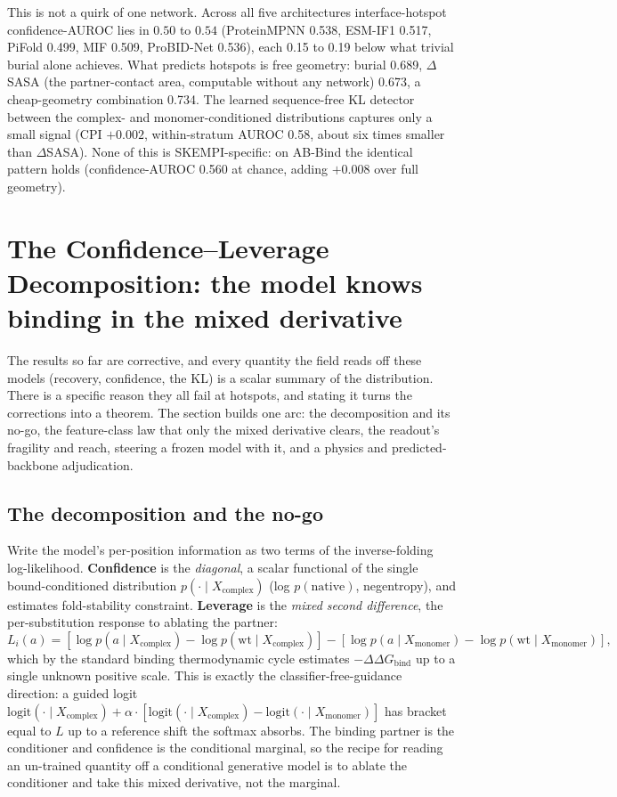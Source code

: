 \documentclass{article} %
\begin{document}
This is not a quirk of one network. Across all five architectures interface-hotspot confidence-AUROC lies in
$0.50$ to $0.54$ (ProteinMPNN 0.538, ESM-IF1 0.517, PiFold 0.499, MIF 0.509, ProBID-Net 0.536), each 0.15 to 0.19
below what trivial burial alone achieves. What predicts hotspots is free geometry: burial 0.689, $\Delta$SASA (the
partner-contact area, computable without any network) 0.673, a cheap-geometry combination 0.734. The learned
sequence-free KL detector between the complex- and monomer-conditioned distributions captures only a small signal
(CPI $+0.002$, within-stratum AUROC 0.58, about six times smaller than $\Delta$SASA). None of this is
SKEMPI-specific: on AB-Bind the identical pattern holds (confidence-AUROC 0.560 at chance, adding $+0.008$ over
full geometry).

\section{The Confidence--Leverage Decomposition: the model knows binding in the mixed derivative}

The results so far are corrective, and every quantity the field reads off these models (recovery, confidence, the
KL) is a scalar summary of the distribution. There is a specific reason they all fail at hotspots, and stating it
turns the corrections into a theorem. The section builds one arc: the decomposition and its no-go, the
feature-class law that only the mixed derivative clears, the readout's fragility and reach, steering a frozen model
with it, and a physics and predicted-backbone adjudication.

\subsection{The decomposition and the no-go}

Write the model's per-position information as two terms of the inverse-folding log-likelihood. \textbf{Confidence}
is the \emph{diagonal}, a scalar functional of the single bound-conditioned distribution $p(\cdot \mid
X_{\text{complex}})$ (log $p(\text{native})$, negentropy), and estimates fold-stability constraint.
\textbf{Leverage} is the \emph{mixed second difference}, the per-substitution response to ablating the partner:
\[
L_i(a) = [\log p(a \mid X_{\text{complex}}) - \log p(\text{wt} \mid X_{\text{complex}})]
       - [\log p(a \mid X_{\text{monomer}}) - \log p(\text{wt} \mid X_{\text{monomer}})],
\]
which by the standard binding thermodynamic cycle estimates $-\Delta\Delta G_{\text{bind}}$ up to a single unknown
positive scale. This is exactly the classifier-free-guidance direction: a guided logit
$\text{logit}(\cdot \mid X_{\text{complex}}) + \alpha \cdot [\text{logit}(\cdot \mid X_{\text{complex}}) -
\text{logit}(\cdot \mid X_{\text{monomer}})]$ has bracket equal to $L$ up to a reference shift the softmax absorbs.
The binding partner is the conditioner and confidence is the conditional marginal, so the recipe for reading an
un-trained quantity off a conditional generative model is to ablate the conditioner and take this mixed
derivative, not the marginal.
\end{document}
